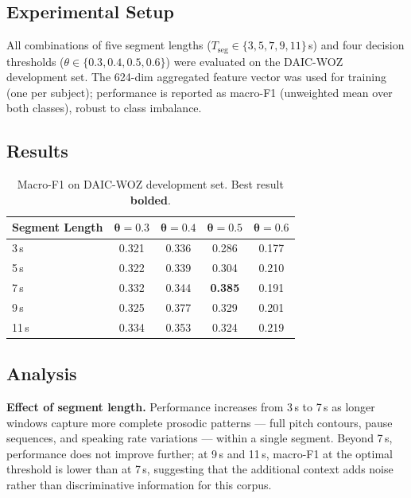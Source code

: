 \subsection{Experimental Setup}

All combinations of five segment lengths ($T_{\text{seg}} \in \{3, 5, 7, 9, 11\}$\,s) and four decision thresholds ($\theta \in \{0.3, 0.4, 0.5, 0.6\}$) were evaluated on the DAIC-WOZ development set. The 624-dim aggregated feature vector was used for training (one per subject); performance is reported as macro-F1 (unweighted mean over both classes), robust to class imbalance.

\subsection{Results}

\begin{table}[h]
\centering
\caption{Macro-F1 on DAIC-WOZ development set. Best result \textbf{bolded}.}
\label{tab:ablation_full}
\begin{tabular}{@{}lcccc@{}}
\toprule
\textbf{Segment Length} & $\boldsymbol{\theta=0.3}$ & $\boldsymbol{\theta=0.4}$ & $\boldsymbol{\theta=0.5}$ & $\boldsymbol{\theta=0.6}$ \\
\midrule
3\,s  & 0.321 & 0.336 & 0.286 & 0.177 \\
5\,s  & 0.322 & 0.339 & 0.304 & 0.210 \\
7\,s  & 0.332 & 0.344 & \textbf{0.385} & 0.191 \\
9\,s  & 0.325 & 0.377 & 0.329 & 0.201 \\
11\,s & 0.334 & 0.353 & 0.324 & 0.219 \\
\bottomrule
\end{tabular}
\end{table}

\subsection{Analysis}

\textbf{Effect of segment length.} Performance increases from 3\,s to 7\,s as longer windows capture more complete prosodic patterns — full pitch contours, pause sequences, and speaking rate variations — within a single segment. Beyond 7\,s, performance does not improve further; at 9\,s and 11\,s, macro-F1 at the optimal threshold is lower than at 7\,s, suggesting that the additional context adds noise rather than discriminative information for this corpus.

